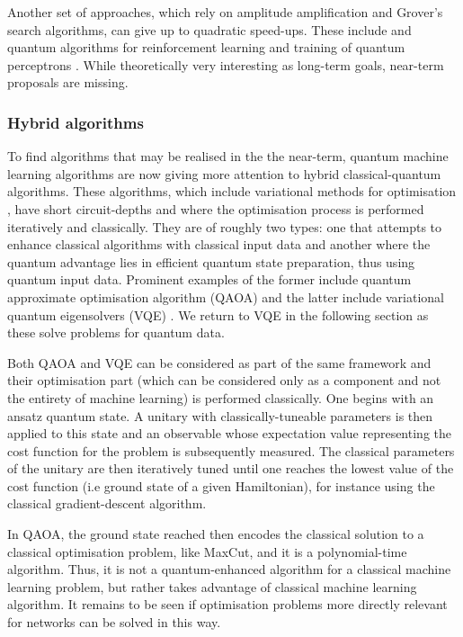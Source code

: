 \documentclass[twocolumn, aps, rmp, amsmath, amssymb, nofootinbib, superscriptaddress, longbibliography, floatfix, table-of-contents, eqsecnum]{revtex4}
\begin{document}
Another set of approaches, which rely on amplitude amplification and Grover's search algorithms, can give up to quadratic speed-ups. These include and quantum algorithms for reinforcement learning \cite{dunjko2016quantum} and training of quantum perceptrons \cite{kapoor2016quantum}. While theoretically very interesting as long-term goals, near-term proposals are missing.

\subsubsection{Hybrid algorithms}

To find algorithms that may be realised in the the near-term, quantum machine learning algorithms are now giving more attention to hybrid classical-quantum algorithms. These algorithms, which include variational methods for optimisation \cite{moll2018quantum}, have short circuit-depths and where the optimisation process is performed iteratively and classically. They are of roughly two types: one that attempts to enhance classical algorithms with classical input data and another where the quantum advantage lies in efficient quantum state preparation, thus using quantum input data. Prominent examples of the former include quantum approximate optimisation algorithm (QAOA) \cite{farhi2014quantum, farhi2016quantum} and the latter include variational quantum eigensolvers (VQE) \cite{peruzzo2014peruzzo, kandala2017hardware}. We return to VQE in the following section as these solve problems for quantum data.

Both QAOA and VQE can be considered as part of the same framework and their optimisation part (which can be considered only as a component and not the entirety of machine learning) is performed classically. One begins with an ansatz quantum state. A unitary with classically-tuneable parameters is then applied to this state and an observable whose expectation value representing the cost function for the problem is subsequently measured. The classical parameters of the unitary are then iteratively tuned until one reaches the lowest value of the cost function (i.e ground state of a given Hamiltonian), for instance using the classical gradient-descent algorithm. \

In QAOA, the ground state reached then encodes the classical solution to a classical optimisation problem, like MaxCut, and it is a polynomial-time algorithm. Thus, it is not a quantum-enhanced algorithm for a classical machine learning problem, but rather takes advantage of classical machine learning algorithm. It remains to be seen if optimisation problems more directly relevant for networks can be solved in this way.
\end{document}
